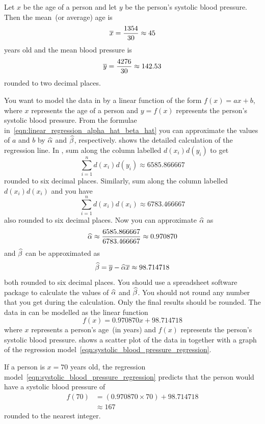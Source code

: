 \documentclass[a4paper,oneside,12pt]{article}
\begin{document}
\begin{solution}
Let $x$ be the age of a person and let $y$ be the person's systolic
blood pressure.  Then the mean~(or average) age is
\[
\overline{x}
=
\frac{1354}{30}
\approx
45
\]
years old and the mean blood pressure is
\[
\overline{y}
=
\frac{4276}{30}
\approx
142.53
\]
rounded to two decimal places.

You want to model the data in  by a linear
function of the form $f(x) = ax + b$, where $x$ represents the age of
a person and $y = f(x)$ represents the person's systolic blood
pressure.  From the formulae
in~\eqref{eqn:linear_regression_alpha_hat_beta_hat} you can
approximate the values of $a$ and $b$ by $\widehat{\alpha}$ and $\widehat{\beta}$,
respectively.   shows the
detailed calculation of the regression line.  In
, sum along the column labelled
$d(x_i) d(y_i)$ to get
\[
\sum_{i=1}^n d(x_i) d(y_i)
\approx
6585.866667
\]
rounded to six decimal places.  Similarly, sum along the column
labelled $d(x_i) d(x_i)$ and you have
\[
\sum_{i=1}^n d(x_i) d(x_i)
\approx
6783.466667
\]
also rounded to six decimal places.  Now you can approximate
$\widehat{\alpha}$ as
\[
\widehat{\alpha}
\approx
\frac{6585.866667}{6783.466667}
\approx
0.970870
\]
and $\widehat{\beta}$ can be approximated as
\[
\widehat{\beta}
=
\overline{y} - \widehat{\alpha} \overline{x}
\approx
98.714718
\]
both rounded to six decimal places.  You should use a spreadsheet
software package to calculate the values of $\widehat{\alpha}$ and
$\widehat{\beta}$.  You should not round any number that you get during the
calculation.  Only the final results should be rounded.  The data in
 can be modelled as the linear function
\begin{equation}
\label{eqn:systolic_blood_pressure_regression}
f(x)
=
0.970870 x + 98.714718
\end{equation}
where $x$ represents a person's age~(in years) and $f(x)$ represents
the person's systolic blood pressure.
 shows a scatter plot of the
data in  together with a graph of the
regression model~\eqref{eqn:systolic_blood_pressure_regression}.

If a person is $x = 70$ years old, the regression
model~\eqref{eqn:systolic_blood_pressure_regression} predicts that the
person would have a systolic blood pressure of
\begin{align*}
f(70)
&=
(0.970870 \times 70) + 98.714718 \\[4pt]
&\approx
167
\end{align*}
rounded to the nearest integer.


\end{solution}
\end{document}

